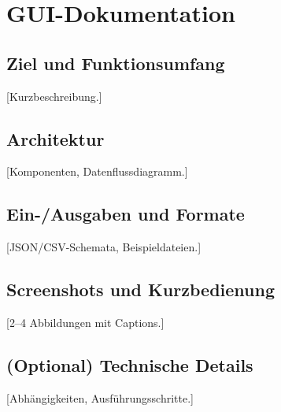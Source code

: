 \chapter{GUI-Dokumentation}
\label{app:gui}

\section{Ziel und Funktionsumfang}
[Kurzbeschreibung.]

\section{Architektur}
[Komponenten, Datenflussdiagramm.]

\section{Ein-/Ausgaben und Formate}
[JSON/CSV-Schemata, Beispieldateien.]

\section{Screenshots und Kurzbedienung}
[2–4 Abbildungen mit Captions.]

\section{(Optional) Technische Details}
[Abhängigkeiten, Ausführungsschritte.]
